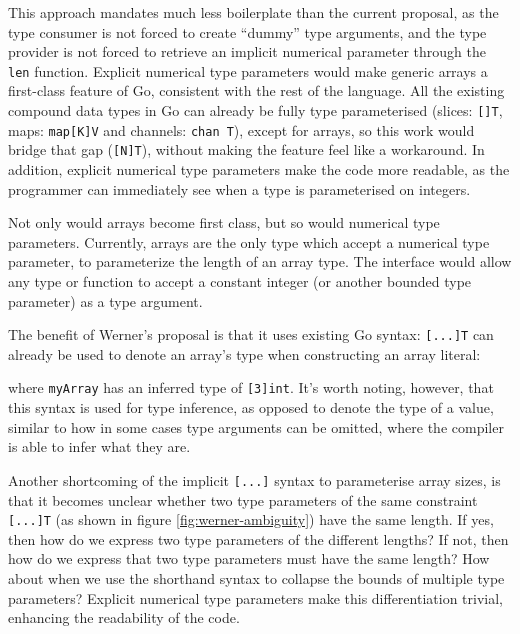 
This approach mandates much less boilerplate than the current proposal, as the
type consumer is not forced to create ``dummy'' type arguments, and the type
provider is not forced to retrieve an implicit numerical parameter through the
\texttt{len} function. Explicit numerical type parameters would make generic
arrays a first-class feature of Go, consistent with the rest of the language.
All the existing compound data types in Go can already be fully type
parameterised (slices: \texttt{[]T}, maps: \texttt{map[K]V} and channels:
\texttt{chan T}), except for arrays, so this work would bridge that gap
(\texttt{[N]T}), without making the feature feel like a workaround. In addition,
explicit numerical type parameters make the code more readable, as the
programmer can immediately see when a type is parameterised on integers.

Not only would arrays become first class, but so would numerical type
parameters. Currently, arrays are the only type which accept a numerical type
parameter, to parameterize the length of an array type. The  interface
would allow any type or function to accept a constant integer (or another
 bounded type parameter) as a type argument.

The benefit of Werner's proposal is that it uses existing Go syntax:
\texttt{[...]T} can already be used to denote an array's type when constructing
an array literal:


where \texttt{myArray} has an inferred type of \texttt{[3]int}. It's worth
noting, however, that this syntax is used for type inference, as opposed to
denote the type of a value, similar to how in some cases type arguments can be
omitted, where the compiler is able to infer what they are.

Another shortcoming of the implicit \texttt{[...]} syntax to parameterise array
sizes, is that it becomes unclear whether two type parameters of the same
constraint \texttt{[...]T} (as shown in figure \ref{fig:werner-ambiguity}) have
the same length. If yes, then how do we express two type parameters of the
different lengths? If not, then how do we express that two type parameters must
have the same length? How about when we use the shorthand syntax to collapse the
bounds of multiple type parameters? Explicit numerical type parameters make this
differentiation trivial, enhancing the readability of the code.

